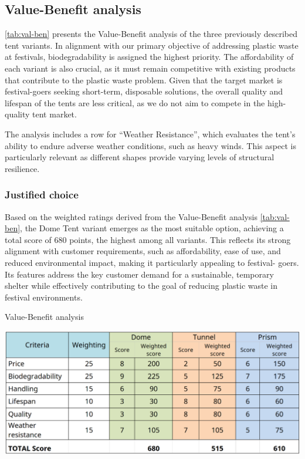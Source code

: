 \documentclass{article}
\begin{document}
\subsection{Value-Benefit analysis}
\autoref{tab:val-ben} presents the Value-Benefit analysis of the three previously described tent
variants. In alignment with our primary objective of addressing plastic waste at festivals,
biodegradability is assigned the highest priority. The affordability of each variant is
also crucial, as it must remain competitive with existing products that contribute to the
plastic waste problem. Given that the target market is festival-goers seeking short-term,
disposable solutions, the overall quality and lifespan of the tents are less critical, as
we do not aim to compete in the high-quality tent market.

The analysis includes a row for ``Weather Resistance'', which evaluates the tent's ability
to endure adverse weather conditions, such as heavy winds. This aspect is particularly
relevant as different shapes provide varying levels of structural resilience.

\subsubsection{Justified choice}
Based on the weighted ratings derived from the Value-Benefit analysis \autoref{tab:val-ben},
the Dome Tent variant emerges as the most suitable option, achieving a
total score of 680 points, the highest among all variants. This reflects its strong
alignment with customer requirements, such as affordability, ease of use, and
reduced environmental impact, making it particularly appealing to festival-
goers. Its features address the key customer demand for a sustainable,
temporary shelter while effectively contributing to the goal of reducing plastic
waste in festival environments.

\begin{table}[ht!]
    \centering
    \caption{Value-Benefit analysis}
    \includegraphics[width=.75\textwidth]{media/val-ben.png}
    \label{tab:val-ben}
\end{table}
\end{document}
